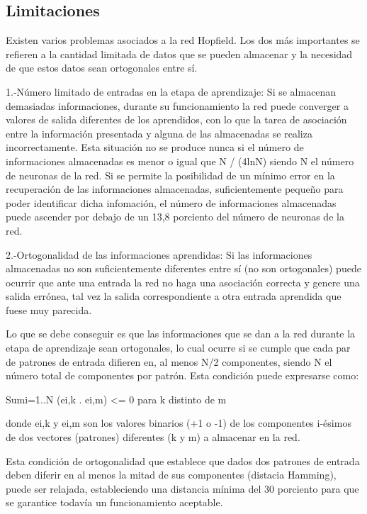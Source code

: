 \documentclass[letterpaper,12pt]{article}
\begin{document}
\subsection{Limitaciones}
Existen varios problemas asociados a la red Hopfield. Los dos más importantes se refieren a la cantidad limitada de datos que se pueden almacenar y la necesidad de que estos datos sean ortogonales entre sí.

\begin{center}
    
1.-Número limitado de entradas en la etapa de aprendizaje:
Si se almacenan demasiadas informaciones, durante su funcionamiento la red puede converger a valores de salida diferentes de los aprendidos, con lo que la tarea de asociación entre la información presentada y alguna de las almacenadas se realiza incorrectamente. Esta situación no se produce nunca si el número de informaciones almacenadas es menor o igual que N / (4lnN) siendo N el número de neuronas de la red. Si se permite la posibilidad de un mínimo error en la recuperación de las informaciones almacenadas, suficientemente pequeño para poder identificar dicha infomación, el número de informaciones almacenadas puede ascender por debajo de un 13,8 porciento del número de neuronas de la red.

2.-Ortogonalidad de las informaciones aprendidas:
Si las informaciones almacenadas no son suficientemente diferentes entre sí (no son ortogonales) puede ocurrir que ante una entrada la red no haga una asociación correcta y genere una salida errónea, tal vez la salida correspondiente a otra entrada aprendida que fuese muy parecida.

Lo que se debe conseguir es que las informaciones que se dan a la red durante la etapa de aprendizaje sean ortogonales, lo cual ocurre si se cumple que cada par de patrones de entrada difieren en, al menos N/2 componentes, siendo N el número total de componentes por patrón. Esta condición puede expresarse como:

\begin{center}
Sumi=1..N (ei,k . ei,m) <= 0 para k distinto de m
\end{center}

donde ei,k y ei,m son los valores binarios (+1 o -1) de los componentes i-ésimos de dos vectores (patrones) diferentes (k y m) a almacenar en la red.

Esta condición de ortogonalidad que establece que dados dos patrones de entrada deben diferir en al menos la mitad de sus componentes (distacia Hamming), puede ser relajada, estableciendo una distancia mínima del 30 porciento para que se garantice todavía un funcionamiento aceptable.

\end{center}
\end{document}
